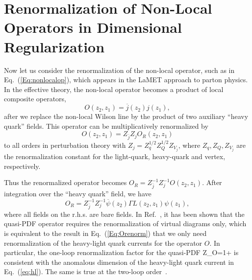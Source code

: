 \section{Renormalization of Non-Local Operators in Dimensional Regularization}

Now let us consider the renormalization of the non-local operator, such as in Eq.~(\ref{Eq:nonlocalop}), which appears
in the LaMET approach to parton physics. In the effective theory, the non-local operator
becomes a product of local composite operators,
\begin{equation}
 O(z_2, z_1) = \overline{j}(z_2) j(z_1),
\end{equation}
after we replace the non-local Wilson line by the product of two auxiliary ``heavy quark'' fields.
 This operator can be multiplicatively renormalized by
 \begin{equation}
        O(z_2,z_1)= Z_{\bar j}Z_{j} O_R(z_2,z_1)
\end{equation}
to all orders in perturbation theory with $Z_{j}=Z_q^{1/2} Z_Q^{1/2} Z_{V_j}$, where $Z_q, Z_Q, Z_{V_j}$ are the renormalization constant for the light-quark, heavy-quark and vertex, respectively.

Thus the renormalized operator becomes $O_R=Z_{\bar j}^{-1}Z_{j}^{-1}O(z_2,z_1)$. After integration over the ``heavy quark'' field, we have
\begin{equation}\label{Eq:Orenorm}
        O_R = Z_{\bar j}^{-1}Z_{j}^{-1} \overline{\psi}(z_2) \Gamma L(z_2,z_1)\psi(z_1),
\end{equation}
where all fields on the r.h.s. are bare fields. In Ref.~\cite{Ji:2015jwa}, it has been shown that the quasi-PDF operator requires the renormalization of virtual diagrams only, which is equivalent to the result in Eq.~(\ref{Eq:Orenorm}) that we only need renormalization of the heavy-light quark currents for the operator $O$. In particular, the one-loop renormalization factor for the quasi-PDF
\beq\label{Eq:1loopZfac}
Z_O=1+
\eeq
is consistent with the anomalous dimension of the heavy-light quark current in Eq.~(\ref{eq:hl}). The same is true at the two-loop order~\cite{Ji:2015jwa}.
